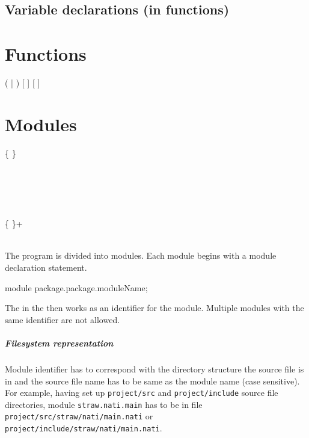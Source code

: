 \section{Variable declarations (in functions)}

\chapter{Functions}
\begin{grammar}
	 (  |  ) [ \kwd{\&} ]   [  ] \\
\end{grammar}

\chapter{Modules}
\begin{grammar}
	   \kwd{;} \{  \} \\
	\\
	  \\
		\grAltLn {} \\
		\grAltLn {} \\
		\grAltLn {} \\
	 \{  \}+ \kwd{:} \\
	 \kwd{\{}  \kwd{\}} \\
\end{grammar}

The program is divided into modules. Each module begins with a module declaration statement.
\begin{code}
module package.package.moduleName;
\end{code}

The  in the  then works as an identifier for the module. Multiple modules with the same identifier are not allowed.

\paragraph{Filesystem representation} Module identifier has to correspond with the directory structure the source file is in and the source file name has to be same as the module name (case sensitive). For example, having set up \verb|project/src| and \verb|project/include| source file directories, module \verb|straw.nati.main| has to be in file \verb|project/src/straw/nati/main.nati| or \verb|project/include/straw/nati/main.nati|.

